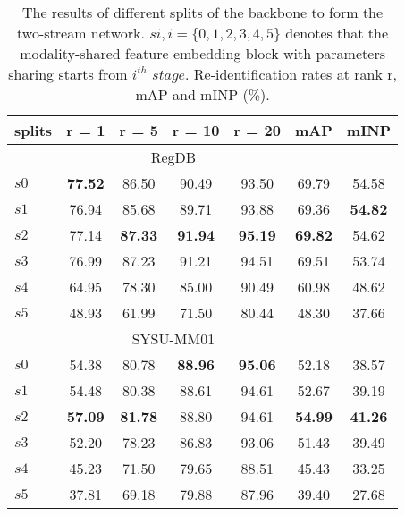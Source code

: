 \documentclass[journal]{IEEEtran}
\begin{document}
\begin{table}
\caption{The results of different splits of the backbone to form the two-stream network. $si, i=\{0,1,2,3,4,5\}$ denotes that the modality-shared feature embedding block with parameters sharing starts from $i^{th}$ $stage$. Re-identification rates at rank r, mAP and mINP (\%).}
\label{tab:net_share}
  \centering
\begin{tabular}{l|c|c|c|c|c|c}
    \toprule[2pt]
    splits  & r = 1 & r = 5 & r = 10 & r = 20 & mAP & mINP \\ \toprule[2pt]
    \multicolumn{6}{c}{RegDB} \\ \hline
    $s0$ & \textbf{77.52} & 86.50 &  90.49 & 93.50 & 69.79 & 54.58 \\
    $s1$ & 76.94 & 85.68 & 89.71  & 93.88 & 69.36 & \textbf{54.82} \\
    $s2$ & 77.14 & \textbf{87.33} & \textbf{91.94}  & \textbf{95.19} & \textbf{69.82} & 54.62 \\
    $s3$ & 76.99 & 87.23 & 91.21  & 94.51 & 69.51 & 53.74 \\
    $s4$ & 64.95 & 78.30 & 85.00  & 90.49 & 60.98 & 48.62 \\
    $s5$ & 48.93 & 61.99 & 71.50  & 80.44 & 48.30 & 37.66 \\  \toprule[2pt]
    \multicolumn{6}{c}{SYSU-MM01}\\ \hline
    $s0$ & 54.38 & 80.78 & \textbf{88.96}  & \textbf{95.06} & 52.18 & 38.57 \\
    $s1$ & 54.48 & 80.38 & 88.61  & 94.61 & 52.67 & 39.19 \\
    $s2$ & \textbf{57.09} & \textbf{81.78} & 88.80  & 94.61 & \textbf{54.99} & \textbf{41.26} \\
    $s3$ & 52.20 & 78.23 & 86.83  & 93.06 & 51.43 & 39.49 \\
    $s4$ & 45.23 & 71.50 & 79.65  & 88.51 & 45.43 & 33.25 \\
    $s5$ & 37.81 & 69.18 & 79.88  & 87.96 & 39.40 & 27.68 \\ \toprule[2pt]
  \end{tabular}
\end{table}
\end{document}
